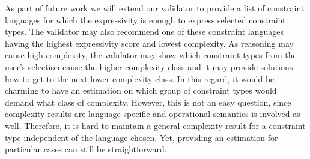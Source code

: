 \documentclass{llncs}
\begin{document}
As part of future work we will extend our validator to provide a list of constraint languages for which the expressivity is enough to express selected constraint types.
The validator may also recommend one of these constraint languages having the highest expressivity score and lowest complexity.
As reasoning may cause high complexity, the validator may show which constraint types from the user's selection cause the higher complexity class 
and it may provide solutions how to get to the next lower complexity class. In this regard, it would be charming to have an estimation on which group of constraint types would demand what class of complexity. However, this is not an easy question, since complexity results are language specific and operational semantics is involved as well. Therefore, it is hard to maintain a general complexity result for a constraint type independent of the language chosen. Yet, providing an estimation for particular cases can still be straightforward.
\end{document}
